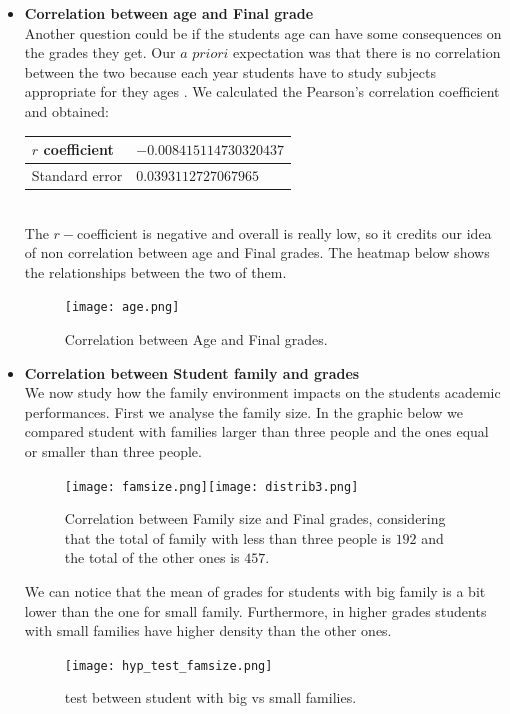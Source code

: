 \documentclass[a4paper, 11pt]{report}
\theoremstyle{definition}
\numberwithin{equation}{section}		%
\numberwithin{figure}{section}			%
\numberwithin{table}{section}				%
\begin{document}
\begin{itemize}
\item \textbf{Correlation between age and Final grade}
\\Another question could be if the students age can have some consequences on the grades they get. Our $a$ $priori$ expectation was that there is no correlation between the two because each year students have to study subjects appropriate for they ages . We calculated the Pearson's correlation coefficient and obtained:
\begin{center}
\begin{tabular}{|p{3cm}|p{4cm}|}
$r$ coefficient & $-0.008415114730320437$ \\
\hline
Standard error & $0.0393112727067965$ \\
\hline
\end{tabular}
\end{center}
\\The $r-$coefficient is negative and overall is really low, so it credits our idea of non correlation between age and Final grades. The heatmap below shows the relationships between the two of them.

\begin{figure}[h]\centering
\texttt{[image: age.png]}
\caption{Correlation between Age and Final grades.}
\end{figure}


\item \textbf{Correlation between Student family and grades}
\\We now study how the family environment impacts on the students academic performances. First we analyse the family size. In the graphic below we compared student with families larger than three people and the ones equal or smaller than three people.

\begin{figure}[h]\centering
\texttt{[image: famsize.png]}\quad\texttt{[image: distrib3.png]}
\caption{Correlation between Family size and Final grades, considering that the total of family with less than three people is $192$ and the total of the other ones is $457$.}
\end{figure}
We can notice that the mean of grades for students with big family is a bit lower than the one for small family. Furthermore, in higher grades students with small families have higher density than the other ones.

\begin{figure}[h]\centering
\texttt{[image: hyp\_test\_famsize.png]}
\caption{test between student with big vs  small families.}
\end{figure}


\end{itemize}
\end{document}
